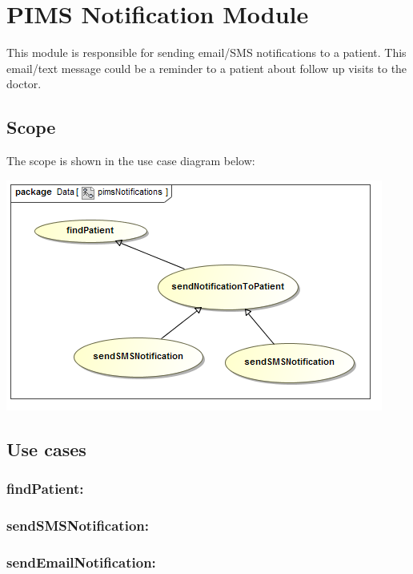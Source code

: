 \section{PIMS Notification Module}
This module is responsible for sending email/SMS notifications to a patient. This email/text message could be a reminder to a patient about follow up visits to the doctor. \par 

\subsection{Scope}
The scope is shown in the use case diagram below: \par
\includegraphics[width=0.75\linewidth]{./Graphics/pimsNotification/pimsNotifications}

\subsection{Use cases}
	\subsubsection{findPatient:} 
	\subsubsection{sendSMSNotification:}
	\subsubsection{sendEmailNotification:}